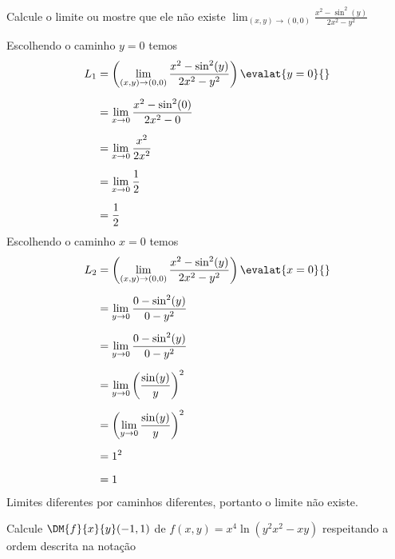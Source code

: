 \documentclass[a4paper,12pt,fleqn]{article}
\begin{document}

Calcule o limite ou mostre que ele não existe
\(
  \lim_{(x, y)\to(0, 0)} \frac{x^2-\sin^2(y)}{2x^2-y^2}
\)

\begin{answer}
Escolhendo o caminho $y=0$ temos
\begin{align*}
  L_1
  & = \left(\lim_{(x, y)\to(0, 0)} \frac{x^2-\sin^2(y)}{2x^2-y^2}\right) \evalat{y=0}{} \\[2mm]
  & = \lim_{x\to 0} \frac{x^2-\sin^2(0)}{2x^2-0} \\[2mm]
  & = \lim_{x\to 0} \frac{x^2}{2x^2} \\[2mm]
  & = \lim_{x\to 0} \frac{1}{2} \\[2mm]
  & = \frac{1}{2}
\end{align*}
Escolhendo o caminho $x=0$ temos
\begin{align*}
  L_2
  & = \left(\lim_{(x, y)\to(0, 0)} \frac{x^2-\sin^2(y)}{2x^2-y^2}\right) \evalat{x=0}{} \\[2mm]
  & = \lim_{y\to0} \frac{0-\sin^2(y)}{0-y^2} \\[2mm]
  & = \lim_{y\to0} \frac{0-\sin^2(y)}{0-y^2} \\[2mm]
  & = \lim_{y\to0} \left(\frac{\sin(y)}{y}\right)^2 \\[2mm]
  & = \left(\lim_{y\to0} \frac{\sin(y)}{y}\right)^2 \\[2mm]
  & = 1^2 \\[2mm]
  & = 1
\end{align*}
Limites diferentes por caminhos diferentes, portanto o limite não existe.
\end{answer}

Calcule \(\DM{f}{x}{y}(-1, 1)\)\! de
\(
  f(x, y) = x^4 \ln\left(y^2x^2 - xy\right)
\)
respeitando a ordem descrita na notação
\end{document}
